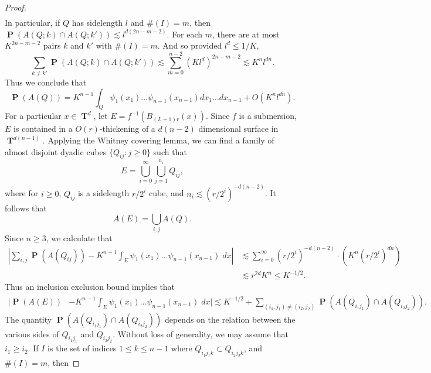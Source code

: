 \documentclass[12pt,reqno]{article}
\numberwithin{equation}{section}
\DeclareMathOperator{\TT}{\mathbf{T}}
\numberwithin{theorem}{section}
\DeclareMathOperator{\PP}{\mathbf{P}}
\begin{document}
\begin{proof}
\begin{equation}
\begin{split}
    \end{split}
    \end{equation}
    In particular, if $Q$ has sidelength $l$ and $\#(I) = m$, then $\PP(A(Q;k) \cap A(Q;k')) \lesssim l^{d(2n - m - 2)}$. For each $m$, there are at most $K^{2n - m - 2}$ pairs $k$ and $k'$ with $\#(I) = m$. And so provided $l^d \leq 1/K$,
    \begin{equation}
        \sum_{k \neq k'} \PP(A(Q;k) \cap A(Q;k')) \lesssim \sum_{m = 0}^{n-2} (Kl^d)^{2n-m-2} \lesssim K^n l^{dn}.
    \end{equation}
    Thus we conclude that
    \begin{equation}
        \PP(A(Q)) = K^{n-1} \int_Q \psi_1(x_1) \dots \psi_{n-1}(x_{n-1}) dx_1 \dots dx_{n-1} + O(K^n l^{dn}).
    \end{equation}
    For a particular $x \in \TT^d$, let $E = f^{-1}(B_{(L+1)r}(x))$. Since $f$ is a submersion, $E$ is contained in a $O(r)$-thickening of a $d(n-2)$ dimensional surface in $\TT^{d(n-1)}$. Applying the Whitney covering lemma, we can find a family of almost disjoint dyadic cubes $\{ Q_{ij} : j \geq 0 \}$ such that
    \[ E = \bigcup_{i = 0}^\infty \bigcup_{j = 1}^{n_i} Q_{ij}, \]
    where for $i \geq 0$, $Q_{ij}$ is a sidelength $r/2^i$ cube, and $n_i \lesssim (r/2^i)^{-d(n-2)}$. It follows that
    \[ A(E) = \bigcup_{i,j} A(Q). \]
    Since $n \geq 3$, we calculate that
    \begin{equation}
    \begin{split}
        \left| \sum_{i,j} \PP(A(Q_{ij})) - K^{n-1} \int_E \psi_1(x_1) \dots \psi_{n-1}(x_{n-1})\; dx \right| &\lesssim \sum_{i = 0}^\infty (r/2^i)^{-d(n-2)} \cdot \left( K^n (r/2^i)^{dn} \right)\\
        &\lesssim r^{2d} K^n \leq K^{-1/2}.
    \end{split}
    \end{equation}
    Thus an inclusion exclusion bound implies that
    \begin{equation}
    \begin{split}
        \Big| \PP(A(E)) &- K^{n-1} \int_E \psi_1(x_1) \dots \psi_{n-1}(x_{n-1})\; dx \Big| \lesssim K^{-1/2} + \sum_{(i_1,j_1) \neq (i_2,j_2)} \PP(A(Q_{i_1j_1}) \cap A(Q_{i_2j_2})).
    \end{split}
    \end{equation}
    The quantity $\PP(A(Q_{i_1j_1}) \cap A(Q_{i_2j_2}))$ depends on the relation between the various sides of $Q_{i_1j_1}$ and $Q_{i_2j_2}$. Without loss of generality, we may assume that $i_1 \geq i_2$. If $I$ is the set of indices $1 \leq k \leq n-1$ where $Q_{i_1j_1k} \subset Q_{i_2j_2k}$, and $\#(I) = m$, then

\end{proof}
\end{document}
